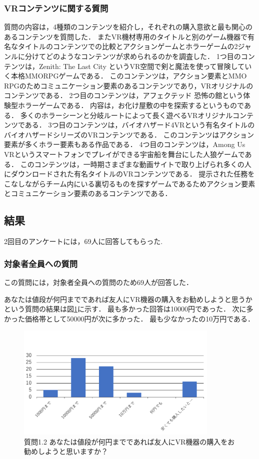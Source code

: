 \documentclass[12pt,a4j]{ltjsarticle}
\begin{document}
\subsubsection{VRコンテンツに関する質問}
質問の内容は，4種類のコンテンツを紹介し，それぞれの購入意欲と最も関心のあるコンテンツを質問した．
またVR機材専用のタイトルと別のゲーム機器で有名なタイトルのコンテンツでの比較とアクションゲームとホラーゲームの2ジャンルに分けてどのようなコンテンツが求められるのかを調査した．
1つ目のコンテンツは，Zenith: The Last City というVR空間で剣と魔法を使って冒険していく本格MMORPGゲームである．
このコンテンツは，アクション要素とMMO RPGのためコミュニケーション要素のあるコンテンツであり，VRオリジナルのコンテンツである．
2つ目のコンテンツは，アフェクテッド 恐怖の館という体験型ホラーゲームである．
内容は，お化け屋敷の中を探索するというものである．
多くのホラーシーンと分岐ルートによって長く遊べるVRオリジナルコンテンツである．
3つ目のコンテンツは，バイオハザード4VRという有名タイトルのバイオハザードシリーズのVRコンテンツである．
このコンテンツはアクション要素が多くホラー要素もある作品である．
4つ目のコンテンツは，Among Us VRというスマートフォンでプレイができる宇宙船を舞台にした人狼ゲームである．
このコンテンツは，一時期さまざまな動画サイトで取り上げられ多くの人にダウンロードされた有名タイトルのVRコンテンツである．
提示された任務をこなしながらチーム内にいる裏切るものを探すゲームであるためアクション要素とコミュニケーション要素のあるコンテンツである．

\subsection{結果}
2回目のアンケートには，69人に回答してもらった.

\subsubsection{対象者全員への質問}
この質問には，対象者全員への質問のため69人が回答した．

あなたは値段が何円までであれば友人にVR機器の購入をお勧めしようと思うかという質問の結果は図\ref{fig:アンケート2_1_2.pdf}に示す．
最も多かった回答は10000円であった．
次に多かった価格帯として50000円が次に多かった．
最も少なかったの10万円である．

\begin{figure}[h]
\begin{center}
 \includegraphics[clip,height=55mm]{
 アンケート2_1_2.pdf}
\end{center}
 \caption{質問1.2 あなたは値段が何円までであれば友人にVR機器の購入をお勧めしようと思いますか？}
 \label{fig:アンケート2_1_2.pdf}
\end{figure}
\end{document}
